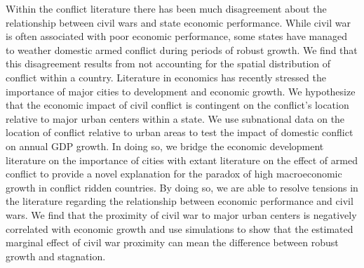 


Within the conflict literature there has been much disagreement about the relationship between civil wars and state economic performance. While civil war is often associated with poor economic performance, some states have managed to weather domestic armed conflict during periods of robust growth. We find that this disagreement results from not accounting for the spatial distribution of conflict within a country. Literature in economics has recently stressed the importance of major cities to development and economic growth. We hypothesize that the economic impact of civil conflict is contingent on the conflict's location relative to major urban centers within a state. We use subnational data on the location of conflict relative to urban areas to test the impact of domestic conflict on annual GDP growth. In doing so, we bridge the economic development literature on the importance of cities with extant literature on the effect of armed conflict to provide a novel explanation for the paradox of high macroeconomic growth in conflict ridden countries. By doing so, we are able to resolve tensions in the literature regarding the relationship between economic performance and civil wars. We find that the proximity of civil war to major urban centers is negatively correlated with economic growth and use simulations to show that the estimated marginal effect of civil war proximity can mean the difference between robust growth and stagnation.